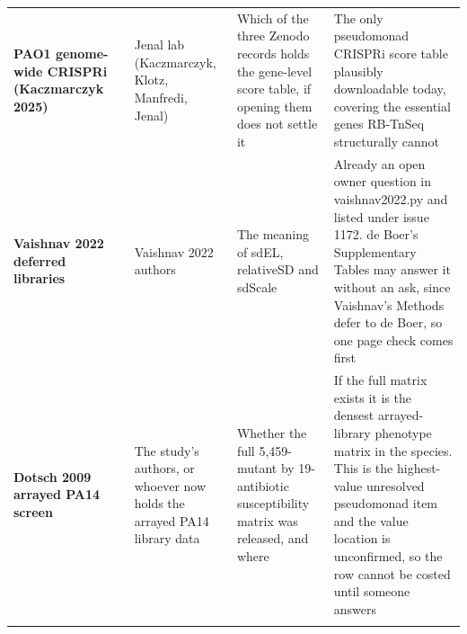 \begin{landscape}
\begin{longtable}{@{}L{38mm} L{16mm} L{40mm} L{78mm} L{70mm}@{}}
\addlinespace[5pt]
\textbf{PAO1 genome-wide CRISPRi (Kaczmarczyk 2025)} &  & Jenal lab (Kaczmarczyk, Klotz, Manfredi, Jenal) & Which of the three Zenodo records holds the gene-level score table, if opening them does not settle it & The only pseudomonad CRISPRi score table plausibly downloadable today, covering the essential genes RB-TnSeq structurally cannot \\
\addlinespace[5pt]
\textbf{Vaishnav 2022 deferred libraries} &  & Vaishnav 2022 authors & The meaning of sdEL, relativeSD and sdScale & Already an open owner question in vaishnav2022.py and listed under issue 1172. de Boer's Supplementary Tables may answer it without an ask, since Vaishnav's Methods defer to de Boer, so one page check comes first \\
\addlinespace[5pt]
\textbf{Dotsch 2009 arrayed PA14 screen} &  & The study's authors, or whoever now holds the arrayed PA14 library data & Whether the full 5,459-mutant by 19-antibiotic susceptibility matrix was released, and where & If the full matrix exists it is the densest arrayed-library phenotype matrix in the species. This is the highest-value unresolved pseudomonad item and the value location is unconfirmed, so the row cannot be costed until someone answers \\
\addlinespace[5pt]
\end{longtable}
\endgroup
\end{landscape}
